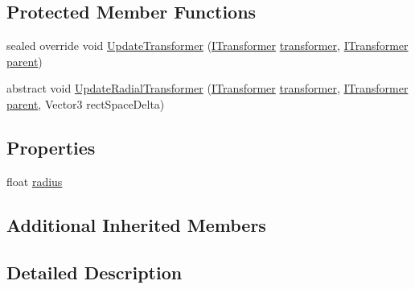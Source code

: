 \subsection*{Protected Member Functions}
\begin{DoxyCompactItemize}
\item 
sealed override void \mbox{\hyperlink{class_leap_1_1_unity_1_1_space_1_1_leap_radial_space_a9214f2211d8c755878962cc0a23e6168}{Update\+Transformer}} (\mbox{\hyperlink{interface_leap_1_1_unity_1_1_space_1_1_i_transformer}{I\+Transformer}} \mbox{\hyperlink{class_leap_1_1_unity_1_1_space_1_1_leap_space_anchor_a6f98d35d75f83e2ff2c978715520c836}{transformer}}, \mbox{\hyperlink{interface_leap_1_1_unity_1_1_space_1_1_i_transformer}{I\+Transformer}} \mbox{\hyperlink{class_leap_1_1_unity_1_1_space_1_1_leap_space_anchor_a8df76f5c9ba6a0f169880fec6bca557b}{parent}})
\item 
abstract void \mbox{\hyperlink{class_leap_1_1_unity_1_1_space_1_1_leap_radial_space_afc597bb7c75791b2f8807b3b810e8c69}{Update\+Radial\+Transformer}} (\mbox{\hyperlink{interface_leap_1_1_unity_1_1_space_1_1_i_transformer}{I\+Transformer}} \mbox{\hyperlink{class_leap_1_1_unity_1_1_space_1_1_leap_space_anchor_a6f98d35d75f83e2ff2c978715520c836}{transformer}}, \mbox{\hyperlink{interface_leap_1_1_unity_1_1_space_1_1_i_transformer}{I\+Transformer}} \mbox{\hyperlink{class_leap_1_1_unity_1_1_space_1_1_leap_space_anchor_a8df76f5c9ba6a0f169880fec6bca557b}{parent}}, Vector3 rect\+Space\+Delta)
\end{DoxyCompactItemize}
\subsection*{Properties}
\begin{DoxyCompactItemize}
\item 
float \mbox{\hyperlink{class_leap_1_1_unity_1_1_space_1_1_leap_radial_space_a1d081038262c174f0ccc7accc0d39897}{radius}}
\end{DoxyCompactItemize}
\subsection*{Additional Inherited Members}


\subsection{Detailed Description}


